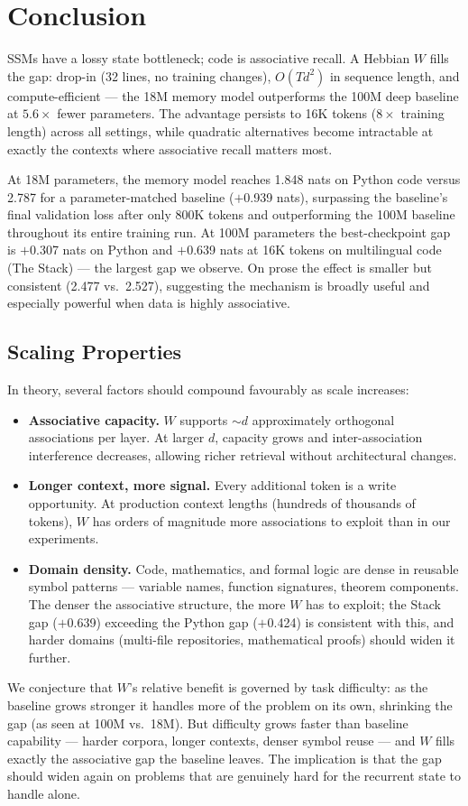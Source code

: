 \documentclass{article}
\begin{document}
\section{Conclusion}

SSMs have a lossy state bottleneck; code is associative recall. A Hebbian $W$ fills the gap: drop-in (32 lines, no training changes), $O(Td^2)$ in sequence length, and compute-efficient --- the 18M memory model outperforms the 100M deep baseline at $5.6\times$ fewer parameters. The advantage persists to 16K tokens ($8\times$ training length) across all settings, while quadratic alternatives become intractable at exactly the contexts where associative recall matters most.

At 18M parameters, the memory model reaches 1.848 nats on Python code versus 2.787 for a parameter-matched baseline ($+$0.939 nats), surpassing the baseline's final validation loss after only 800K tokens and outperforming the 100M baseline throughout its entire training run. At 100M parameters the best-checkpoint gap is $+$0.307 nats on Python and $+$0.639 nats at 16K tokens on multilingual code (The Stack) --- the largest gap we observe. On prose the effect is smaller but consistent (2.477 vs.\ 2.527), suggesting the mechanism is broadly useful and especially powerful when data is highly associative.

\subsection*{Scaling Properties}
In theory, several factors should compound favourably as scale increases:
\begin{itemize}
  \item \textbf{Associative capacity.} $W$ supports ${\sim}d$ approximately orthogonal associations per layer. At larger $d$, capacity grows and inter-association interference decreases, allowing richer retrieval without architectural changes.
  \item \textbf{Longer context, more signal.} Every additional token is a write opportunity. At production context lengths (hundreds of thousands of tokens), $W$ has orders of magnitude more associations to exploit than in our experiments.
  \item \textbf{Domain density.} Code, mathematics, and formal logic are dense in reusable symbol patterns --- variable names, function signatures, theorem components. The denser the associative structure, the more $W$ has to exploit; the Stack gap ($+$0.639) exceeding the Python gap ($+$0.424) is consistent with this, and harder domains (multi-file repositories, mathematical proofs) should widen it further.
\end{itemize}
We conjecture that $W$'s relative benefit is governed by task difficulty: as the baseline grows stronger it handles more of the problem on its own, shrinking the gap (as seen at 100M vs.\ 18M). But difficulty grows faster than baseline capability --- harder corpora, longer contexts, denser symbol reuse --- and $W$ fills exactly the associative gap the baseline leaves. The implication is that the gap should widen again on problems that are genuinely hard for the recurrent state to handle alone.
\end{document}

